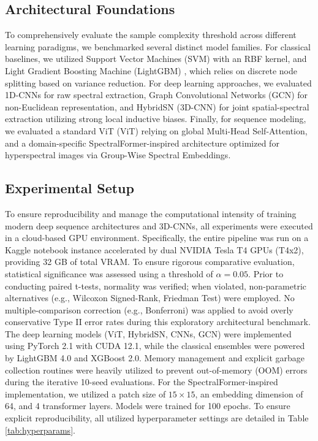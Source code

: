 \documentclass[pdflatex,sn-mathphys-num,iicol]{sn-jnl}
\begin{document}
\subsection{Architectural Foundations}
To comprehensively evaluate the sample complexity threshold across different learning paradigms, we benchmarked several distinct model families. For classical baselines, we utilized Support Vector Machines (SVM) with an RBF kernel, and Light Gradient Boosting Machine (LightGBM) \cite{b27}, which relies on discrete node splitting based on variance reduction. For deep learning approaches, we evaluated 1D-CNNs for raw spectral extraction, Graph Convolutional Networks (GCN) for non-Euclidean representation, and HybridSN (3D-CNN) \cite{b15} for joint spatial-spectral extraction utilizing strong local inductive biases. Finally, for sequence modeling, we evaluated a standard ViT (ViT) relying on global Multi-Head Self-Attention, and a domain-specific SpectralFormer-inspired \cite{b8} architecture optimized for hyperspectral images via Group-Wise Spectral Embeddings.

\subsection{Experimental Setup}
To ensure reproducibility and manage the computational intensity of training modern deep sequence architectures and 3D-CNNs, all experiments were executed in a cloud-based GPU environment. Specifically, the entire pipeline was run on a Kaggle notebook instance accelerated by dual NVIDIA Tesla T4 GPUs (T4x2), providing 32 GB of total VRAM. To ensure rigorous comparative evaluation, statistical significance was assessed using a threshold of $\alpha = 0.05$. Prior to conducting paired t-tests, normality was verified; when violated, non-parametric alternatives (e.g., Wilcoxon Signed-Rank, Friedman Test) were employed. No multiple-comparison correction (e.g., Bonferroni) was applied to avoid overly conservative Type II error rates during this exploratory architectural benchmark. The deep learning models (ViT, HybridSN, CNNs, GCN) were implemented using PyTorch 2.1 with CUDA 12.1, while the classical ensembles were powered by LightGBM 4.0 and XGBoost 2.0. Memory management and explicit garbage collection routines were heavily utilized to prevent out-of-memory (OOM) errors during the iterative 10-seed evaluations. For the SpectralFormer-inspired implementation, we utilized a patch size of $15 \times 15$, an embedding dimension of 64, and 4 transformer layers. Models were trained for 100 epochs. To ensure explicit reproducibility, all utilized hyperparameter settings are detailed in Table \ref{tab:hyperparams}.
\end{document}
